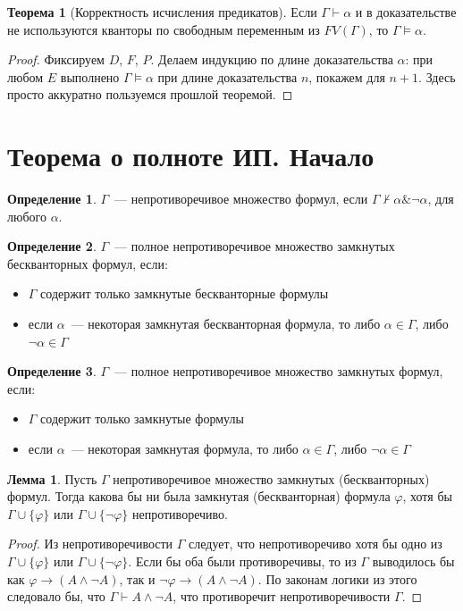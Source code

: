 \documentclass[a4paper,11pt]{article}
\theoremstyle{definition}
\newtheorem*{thm}{Теорема}
\newtheorem*{lmm}{Лемма}
\newtheorem*{dfn}{Определение}
\newcommand{\proves}{\vdash}
\newcommand{\amp}{\mathbin{\&}}
\begin{document}
\begin{thm}[Корректность исчисления предикатов]
Если $\Gamma \proves \alpha$ и в доказательстве не используются кванторы по
свободным переменным из $FV(\Gamma)$, то $\Gamma \models \alpha$.
\end{thm}
\begin{proof}
Фиксируем $D$, $F$, $P$. Делаем индукцию по длине доказательства $\alpha$: при
любом $E$ выполнено $\Gamma \models \alpha$ при длине доказательства $n$,
покажем для $n+1$. Здесь просто аккуратно пользуемся прошлой теоремой.
\end{proof}

\section{Теорема о полноте ИП. Начало}
\begin{dfn}
$\Gamma$~--- непротиворечивое множество формул, если $\Gamma \nvdash \alpha
\amp \neg\alpha$, для любого $\alpha$.
\end{dfn}
\begin{dfn}
$\Gamma$~--- полное непротиворечивое множество замкнутых бескванторных формул,
если:
\begin{itemize}
\item $\Gamma$ содержит только замкнутые бескванторные формулы
\item если $\alpha$~--- некоторая замкнутая бескванторная формула, то либо
  $\alpha \in \Gamma$, либо $\neg\alpha \in \Gamma$
\end{itemize}
\end{dfn}
\begin{dfn}
$\Gamma$~--- полное непротиворечивое множество замкнутых формул, если:
\begin{itemize}
\item $\Gamma$ содержит только замкнутые формулы
\item если $\alpha$~--- некоторая замкнутая формула, то либо $\alpha \in
  \Gamma$, либо $\neg\alpha \in \Gamma$
\end{itemize}
\end{dfn}

\begin{lmm}
Пусть $\Gamma$ непротиворечивое множество замкнутых (бескванторных) формул.
Тогда какова бы ни была замкнутая (бескванторная) формула $\varphi$, хотя бы
$\Gamma \cup \{\varphi\}$ или $\Gamma \cup \{\neg\varphi\}$ непротиворечиво.
\end{lmm}
\begin{proof}
Из непротиворечивости $\Gamma$ следует, что непротиворечиво хотя бы одно из
$\Gamma \cup \{\varphi\}$ или $\Gamma \cup \{\neg\varphi\}$. Если бы оба были
противоречивы, то из $\Gamma$ выводилось бы как $\varphi \to (A \wedge \neg A)$,
так и $\neg\varphi \to (A \wedge \neg A)$. По законам логики из этого следовало
бы, что $\Gamma \proves A \wedge \neg A$, что противоречит непротиворечивости
$\Gamma$.
\end{proof}
\end{document}
